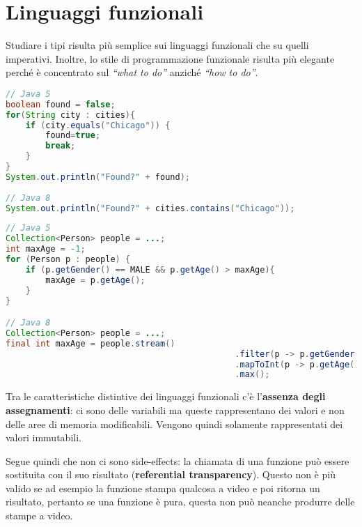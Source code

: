 \section{Linguaggi funzionali}

Studiare i tipi risulta più semplice sui linguaggi funzionali che su quelli imperativi.
Inoltre, lo stile di programmazione funzionale risulta più elegante perché è concentrato sul \textit{``what to do''} anziché \textit{``how to do''}.

\begin{lstlisting}[language=Java, caption=Confronto tra Java 5 e Java 8: nel secondo caso è subito chiaro l'intento del programmatore inoltre non vengono aggiunte variabili \textit{mutable}. Tuttavia l'esempio non usa le caratteristiche funzionali di Java8]
// Java 5
boolean found = false;
for(String city : cities){
	if (city.equals("Chicago")) {
		found=true;
		break;
	}
}
System.out.println("Found?" + found);
	
// Java 8
System.out.println("Found?" + cities.contains("Chicago"));
\end{lstlisting}

\begin{lstlisting}[language = Java, caption=Confronto tra Java 5 e Java 8: l'utlilizzo delle funzioni lambda rende il codice più conciso. Inoltre non vengono usate variabili mutabili e il codice è facilmente parallelizzabile.]
// Java 5
Collection<Person> people = ...;
int maxAge = -1;
for (Person p : people) {
	if (p.getGender() == MALE && p.getAge() > maxAge){
		maxAge = p.getAge();
	}
}

// Java 8
Collection<Person> people = ...;
final int maxAge = people.stream()
										      .filter(p -> p.getGender() == MALE)
										      .mapToInt(p -> p.getAge())
										      .max();
\end{lstlisting}

\noindent Tra le caratteristiche distintive dei linguaggi funzionali c'è l'\textbf{assenza degli assegnamenti}: ci sono delle variabili ma queste rappresentano dei valori e non delle aree di memoria modificabili. Vengono quindi solamente rappresentati dei valori immutabili.

Segue quindi che non ci sono side-effects: la chiamata di una funzione può essere sostituita con il suo risultato (\textbf{referential transparency}). Questo non è più valido se ad esempio la funzione stampa qualcosa a video e poi ritorna un risultato, pertanto se una funzione è pura, questa non può neanche produrre delle stampe a video.

